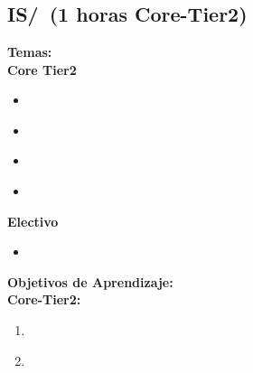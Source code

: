 \section{\IS}\label{sec:BOK:IS}
\ISBOKDescription


\subsection{IS/\ISFundamentalIssues~(1 horas Core-Tier2)}\label{sec:BOK:ISFundamentalIssues}
\noindent \textbf{Temas:}\\
\noindent \textbf{Core Tier2}
\begin{itemize}
	\item \ISFundamentalIssuesTopicOverview\label{sec:BOK:ISFundamentalIssuesTopicOverview}
	\item \ISFundamentalIssuesTopicWhat\label{sec:BOK:ISFundamentalIssuesTopicWhat}
	\item \ISFundamentalIssuesTopicProblem\label{sec:BOK:ISFundamentalIssuesTopicProblem}
	\item \ISFundamentalIssuesTopicNature\label{sec:BOK:ISFundamentalIssuesTopicNature}
\end{itemize}

\noindent \textbf{Electivo}
\begin{itemize}
	\item \ISFundamentalIssuesTopicPhilosophical\label{sec:BOK:ISFundamentalIssuesTopicPhilosophical}
\end{itemize}


\noindent \textbf{Objetivos de Aprendizaje:}\\
\noindent \textbf{Core-Tier2:}
\begin{enumerate}
	\setcounter{enumi}{0}
	\item \ISFundamentalIssuesLODescribeTuring\xspace[\ISFundamentalIssuesLODescribeTuringLevel]\label{sec:BOK:ISFundamentalIssuesLODescribeTuring}
	\item \ISFundamentalIssuesLODeterming\xspace[\ISFundamentalIssuesLODetermingLevel]\label{sec:BOK:ISFundamentalIssuesLODeterming}
\end{enumerate}


